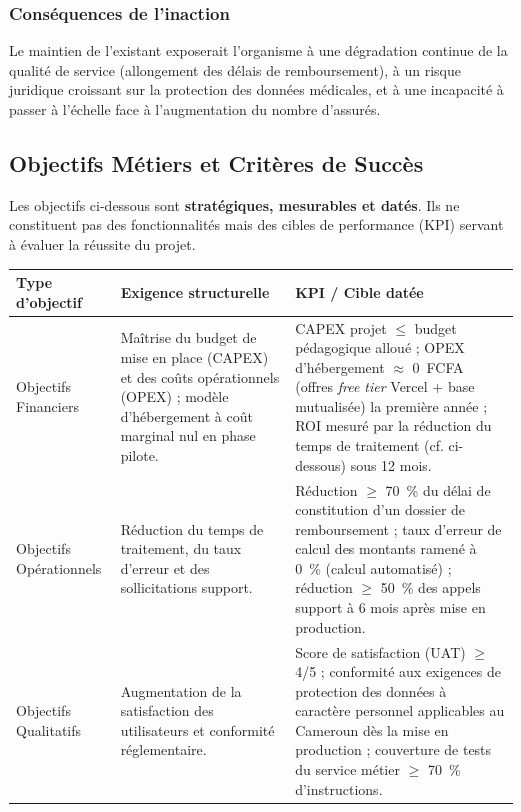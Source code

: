 \documentclass[11pt,a4paper]{article}
\begin{document}
\subsubsection{Conséquences de l'inaction}
Le maintien de l'existant exposerait l'organisme à une dégradation continue de la
qualité de service (allongement des délais de remboursement), à un risque
juridique croissant sur la protection des données médicales, et à une incapacité
à passer à l'échelle face à l'augmentation du nombre d'assurés.

\subsection{Objectifs Métiers et Critères de Succès}

Les objectifs ci-dessous sont \textbf{stratégiques, mesurables et datés}. Ils ne
constituent pas des fonctionnalités mais des cibles de performance (KPI) servant à
évaluer la réussite du projet.

\begin{center}
\begin{longtable}{|L{3.0cm}|L{6.0cm}|L{4.6cm}|}
\hline
{}\textbf{Type d'objectif} & \textbf{Exigence structurelle} & \textbf{KPI / Cible datée}\\\hline
\endhead
Objectifs Financiers &
Maîtrise du budget de mise en place (CAPEX) et des coûts opérationnels (OPEX) ;
modèle d'hébergement à coût marginal nul en phase pilote. &
CAPEX projet $\leq$ budget pédagogique alloué ; OPEX d'hébergement $\approx$ 0~FCFA
(offres \emph{free tier} Vercel + base mutualisée) la première année ; ROI mesuré
par la réduction du temps de traitement (cf. ci-dessous) sous 12 mois.\\\hline
Objectifs Opérationnels &
Réduction du temps de traitement, du taux d'erreur et des sollicitations support. &
Réduction $\geq$ 70~\% du délai de constitution d'un dossier de remboursement ;
taux d'erreur de calcul des montants ramené à 0~\% (calcul automatisé) ;
réduction $\geq$ 50~\% des appels support à 6 mois après mise en production.\\\hline
Objectifs Qualitatifs &
Augmentation de la satisfaction des utilisateurs et conformité réglementaire. &
Score de satisfaction (UAT) $\geq$ 4/5 ; conformité aux exigences de protection
des données à caractère personnel applicables au Cameroun dès la mise en
production ; couverture de tests du service métier $\geq$ 70~\% d'instructions.\\\hline
\end{longtable}
\end{center}
\end{document}
